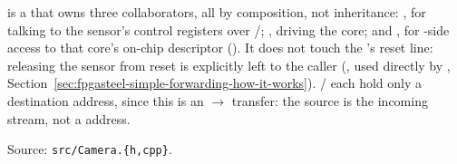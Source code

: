  is a  that owns three collaborators, all by composition, not inheritance: , for talking to the sensor's control registers over /; , driving the  core; and , for -side access to that core's on-chip descriptor  (). It does not touch the 's  reset line: releasing the sensor from reset is explicitly left to the caller (, used directly by , Section~\ref{sec:fpgasteel-simple-forwarding-how-it-works}). / each hold only a destination address, since this is an $\rightarrow$ transfer: the source is the incoming  stream, not a  address.

Source: \lstinline[style=inlineFsRepo]!src/Camera.{h,cpp}!.


